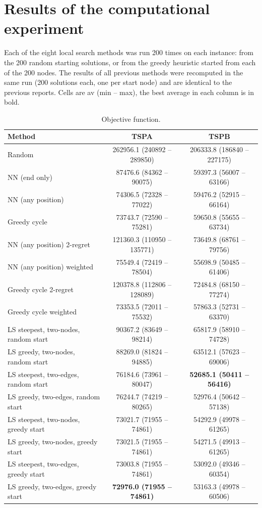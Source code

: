 \documentclass[11pt,a4paper]{article}
\begin{document}
\section{Results of the computational experiment}
Each of the eight local search methods was run 200 times on each instance: from the 200 random
starting solutions, or from the greedy heuristic started from each of the 200 nodes. The results of
all previous methods were recomputed in the same run (200 solutions each, one per start node) and are
identical to the previous reports. Cells are av (min -- max), the best average in each column is in
bold.
\begin{table}[H]
\centering
\small
\begin{tabular}{lcc}
\toprule
Method & TSPA & TSPB \\
\midrule
Random & 262956.1 (240892 -- 289850) & 206333.8 (186840 -- 227175) \\
NN (end only) & 87476.6 (84362 -- 90075) & 59397.3 (56007 -- 63166) \\
NN (any position) & 74306.5 (72328 -- 77022) & 59476.2 (52915 -- 66164) \\
Greedy cycle & 73743.7 (72590 -- 75281) & 59650.8 (55655 -- 63734) \\
NN (any position) 2-regret & 121360.3 (110950 -- 135771) & 73649.8 (68761 -- 79756) \\
NN (any position) weighted & 75549.4 (72419 -- 78504) & 55698.9 (50485 -- 61406) \\
Greedy cycle 2-regret & 120378.8 (112806 -- 128089) & 72484.8 (68150 -- 77274) \\
Greedy cycle weighted & 73353.5 (72011 -- 75532) & 57863.3 (52731 -- 63370) \\
\midrule
LS steepest, two-nodes, random start & 90367.2 (83649 -- 98214) & 65817.9 (58910 -- 74728) \\
LS greedy, two-nodes, random start & 88269.0 (81824 -- 94885) & 63512.1 (57623 -- 69006) \\
LS steepest, two-edges, random start & 76184.6 (73961 -- 80047) & \textbf{52685.1 (50411 -- 56416)} \\
LS greedy, two-edges, random start & 76244.7 (74219 -- 80265) & 52976.4 (50642 -- 57138) \\
LS steepest, two-nodes, greedy start & 73021.7 (71955 -- 74861) & 54292.9 (49978 -- 61265) \\
LS greedy, two-nodes, greedy start & 73021.5 (71955 -- 74861) & 54271.5 (49913 -- 61265) \\
LS steepest, two-edges, greedy start & 73003.8 (71955 -- 74861) & 53092.0 (49346 -- 60354) \\
LS greedy, two-edges, greedy start & \textbf{72976.0 (71955 -- 74861)} & 53163.3 (49978 -- 60506) \\
\bottomrule
\end{tabular}
\caption{Objective function.}
\end{table}
\end{document}
